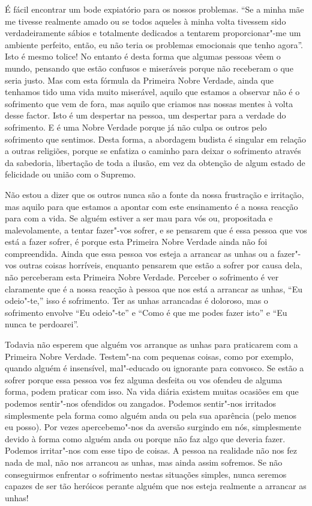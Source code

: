 É fácil encontrar um bode expiatório para os nossos problemas. “Se a minha mãe
me tivesse realmente amado ou se todos aqueles à minha volta tivessem sido
verdadeiramente sábios e totalmente dedicados a tentarem proporcionar"-me um
ambiente perfeito, então, eu não teria os problemas emocionais que tenho agora”.
Isto é mesmo tolice! No entanto é desta forma que algumas pessoas vêem o mundo,
pensando que estão confusos e miseráveis porque não receberam o que seria justo.
Mas com esta fórmula da Primeira Nobre Verdade, ainda que tenhamos tido uma vida
muito miserável, aquilo que estamos a observar não é o sofrimento que vem de
fora, mas aquilo que criamos nas nossas mentes à volta desse factor. Isto é um
despertar na pessoa, um despertar para a verdade do sofrimento. E é uma Nobre
Verdade porque já não culpa os outros pelo sofrimento que sentimos. Desta forma,
a abordagem budista é singular em relação a outras religiões, porque se enfatiza
o caminho para deixar o sofrimento através da sabedoria, libertação de toda a
ilusão, em vez da obtenção de algum estado de felicidade ou união com o Supremo.

Não estou a dizer que os outros nunca são a fonte da nossa frustração e
irritação, mas aquilo para que estamos a apontar com este ensinamento é a nossa
reacção para com a vida. Se alguém estiver a ser mau para vós ou, propositada e
malevolamente, a tentar fazer"-vos sofrer, e se pensarem que é essa pessoa que
vos está a fazer sofrer, é porque esta Primeira Nobre Verdade ainda não foi compreendida.
Ainda que essa pessoa vos esteja a arrancar as unhas ou a fazer"-vos outras coisas
horríveis, enquanto pensarem que estão a sofrer por causa dela, não
perceberam esta Primeira Nobre Verdade. Perceber o sofrimento é ver claramente
que é a nossa reacção à pessoa que nos está a arrancar as unhas, “Eu odeio"-te,”
isso é sofrimento. Ter as unhas arrancadas é doloroso, mas o sofrimento envolve
“Eu odeio"-te” e “Como é que me podes fazer isto” e “Eu nunca te perdoarei”.

Todavia não esperem que alguém vos arranque as unhas para praticarem com a
Primeira Nobre Verdade. Testem"-na com pequenas coisas, como por exemplo, quando
alguém é insensível, mal"-educado ou ignorante para convosco. Se estão a sofrer
porque essa pessoa vos fez alguma desfeita ou vos ofendeu de alguma forma, podem
praticar com isso. Na vida diária existem muitas ocasiões em que podemos
sentir"-nos ofendidos ou zangados. Podemos sentir"-nos irritados simplesmente pela
forma como alguém anda ou pela sua aparência (pelo menos eu posso). Por vezes
apercebemo"-nos da aversão surgindo em nós, simplesmente devido à forma como
alguém anda ou porque não faz algo que deveria fazer. Podemos irritar"-nos com
esse tipo de coisas. A pessoa na realidade não nos fez nada de mal, não nos
arrancou as unhas, mas ainda assim sofremos. Se não conseguirmos enfrentar o
sofrimento nestas situações simples, nunca seremos capazes de ser tão heróicos
perante alguém que nos esteja realmente a arrancar as unhas!

